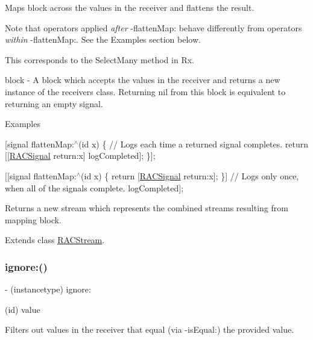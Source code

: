 Maps {\ttfamily block} across the values in the receiver and flattens the result.

Note that operators applied {\itshape after} -\/flatten\+Map\+: behave differently from operators {\itshape within} -\/flatten\+Map\+:. See the Examples section below.

This corresponds to the {\ttfamily Select\+Many} method in Rx.

block -\/ A block which accepts the values in the receiver and returns a new instance of the receiver\textquotesingle{}s class. Returning {\ttfamily nil} from this block is equivalent to returning an empty signal.

Examples

\mbox{[}signal flatten\+Map\+:$^\wedge$(id x) \{ // Logs each time a returned signal completes. return \mbox{[}\mbox{[}\mbox{\hyperlink{interface_r_a_c_signal}{R\+A\+C\+Signal}} return\+:x\mbox{]} log\+Completed\mbox{]}; \}\mbox{]};

\mbox{[}\mbox{[}signal flatten\+Map\+:$^\wedge$(id x) \{ return \mbox{[}\mbox{\hyperlink{interface_r_a_c_signal}{R\+A\+C\+Signal}} return\+:x\mbox{]}; \}\mbox{]} // Logs only once, when all of the signals complete. log\+Completed\mbox{]};

Returns a new stream which represents the combined streams resulting from mapping {\ttfamily block}. 

Extends class \mbox{\hyperlink{interface_r_a_c_stream_a2441b0306adc6ae2845219f8b116119a}{R\+A\+C\+Stream}}.

\mbox{\label{category_r_a_c_stream_07_operations_08_aa0bf73c86006176e745390ee2b3645b2}} 
\subsubsection{\texorpdfstring{ignore\+:()}{ignore:()}\hspace{0.1cm}{\footnotesize\ttfamily [1/3]}}
{\footnotesize\ttfamily -\/ (instancetype) ignore\+: \begin{DoxyParamCaption}\item[{(id)}]{value }\end{DoxyParamCaption}}

Filters out values in the receiver that equal (via -\/is\+Equal\+:) the provided value.

